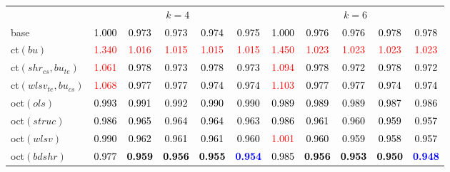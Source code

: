 \begin{tabular}[t]{l|>{}cccc>{}c|ccccc}
\addlinespace[0.3em]
\multicolumn{1}{c}{} & \multicolumn{5}{c}{\textbf{$k = 4$}} & \multicolumn{5}{c}{\textbf{$k = 6$}}\\
base & \textcolor{black}{1.000} & \textcolor{black}{0.973} & \textcolor{black}{0.973} & \textcolor{black}{0.974} & \textcolor{black}{0.975} & \textcolor{black}{1.000} & \textcolor{black}{0.976} & \textcolor{black}{0.976} & \textcolor{black}{0.978} & \textcolor{black}{0.978}\\
ct$(bu)$ & \textcolor{red}{1.340} & \textcolor{red}{1.016} & \textcolor{red}{1.015} & \textcolor{red}{1.015} & \textcolor{red}{1.015} & \textcolor{red}{1.450} & \textcolor{red}{1.023} & \textcolor{red}{1.023} & \textcolor{red}{1.023} & \textcolor{red}{1.023}\\
ct$(shr_{cs}, bu_{te})$ & \textcolor{red}{1.061} & \textcolor{black}{0.978} & \textcolor{black}{0.973} & \textcolor{black}{0.978} & \textcolor{black}{0.973} & \textcolor{red}{1.094} & \textcolor{black}{0.978} & \textcolor{black}{0.972} & \textcolor{black}{0.978} & \textcolor{black}{0.972}\\
ct$(wlsv_{te}, bu_{cs})$ & \textcolor{red}{1.068} & \textcolor{black}{0.977} & \textcolor{black}{0.977} & \textcolor{black}{0.974} & \textcolor{black}{0.974} & \textcolor{red}{1.103} & \textcolor{black}{0.977} & \textcolor{black}{0.977} & \textcolor{black}{0.974} & \textcolor{black}{0.974}\\
oct$(ols)$ & \textcolor{black}{0.993} & \textcolor{black}{0.991} & \textcolor{black}{0.992} & \textcolor{black}{0.990} & \textcolor{black}{0.990} & \textcolor{black}{0.989} & \textcolor{black}{0.989} & \textcolor{black}{0.989} & \textcolor{black}{0.987} & \textcolor{black}{0.986}\\
oct$(struc)$ & \textcolor{black}{0.986} & \textcolor{black}{0.965} & \textcolor{black}{0.964} & \textcolor{black}{0.964} & \textcolor{black}{0.963} & \textcolor{black}{0.986} & \textcolor{black}{0.961} & \textcolor{black}{0.960} & \textcolor{black}{0.959} & \textcolor{black}{0.957}\\
oct$(wlsv)$ & \textcolor{black}{0.990} & \textcolor{black}{0.962} & \textcolor{black}{0.961} & \textcolor{black}{0.961} & \textcolor{black}{0.960} & \textcolor{red}{1.001} & \textcolor{black}{0.960} & \textcolor{black}{0.959} & \textcolor{black}{0.958} & \textcolor{black}{0.957}\\
oct$(bdshr)$ & \textcolor{black}{0.977} & \textcolor{black}{\textbf{0.959}} & \textcolor{black}{\textbf{0.956}} & \textcolor{black}{\textbf{0.955}} & \textcolor{blue}{\textbf{0.954}} & \textcolor{black}{0.985} & \textcolor{black}{\textbf{0.956}} & \textcolor{black}{\textbf{0.953}} & \textcolor{black}{\textbf{0.950}} & \textcolor{blue}{\textbf{0.948}}\\

\end{tabular}

